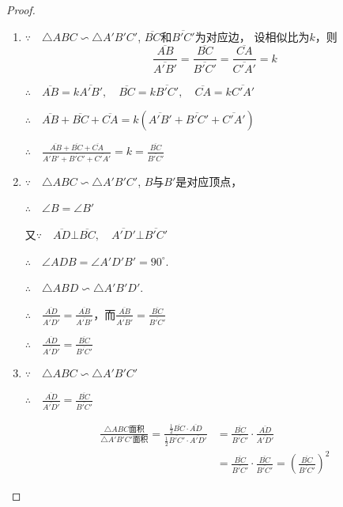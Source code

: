 \begin{proof}
\begin{enumerate}
    \item $\because\quad \triangle ABC\backsim \triangle A'B'C'$, $\overline{BC}$和$\overline{B'C'}$为对应边，
    设相似比为$k$，则
\[\frac{\overline{AB}}{\overline{A'B'}}=\frac{\overline{BC}}{\overline{B'C'}}=\frac{\overline{CA}}{\overline{C'A'}}=k\]

$\therefore\quad \overline{AB}=k\overline{A'B'},\quad  \overline{BC}=k\overline{B'C'},\quad \overline{CA}= k\overline{C'A'}$

$\therefore\quad \overline{AB}+\overline{BC}+\overline{CA}=k\left(\overline{A'B'}+\overline{B'C'}+\overline{C'A'}\right)$

$\therefore\quad \frac{\overline{AB} + \overline{BC} +\overline{CA}}{\overline{A'B'} + \overline{B'C'} +\overline{C'A'}}=k=\frac{\overline{BC}}{\overline{B'C'}}$

\item $\because\quad \triangle ABC\backsim\triangle A'B'C'$, $B$与$B'$是对应顶点，

$\therefore\quad \angle B=\angle B'$

    又$\because\quad \overline{AD}\bot \overline{BC},\quad \overline{A'D'}\bot \overline{B'C'}$

$\therefore\quad \angle ADB=\angle A'D'B'=90^{\circ}$.

$\therefore\quad \triangle ABD\backsim \triangle A'B'D'$.

$\therefore\quad \frac{\overline{AD}}{\overline{A'D'}}=\frac{\overline{AB}}{\overline{A'B'}}$，而$\frac{\overline{AB}}{\overline{A'B'}}=\frac{\overline{BC}}{\overline{B'C'}}$

$\therefore\quad \frac{\overline{AD}}{\overline{A'D'}}=\frac{\overline{BC}}{\overline{B'C'}}$

\item $\because\quad \triangle ABC\backsim \triangle A'B'C'$

$\therefore\quad \frac{\overline{AD}}{\overline{A'D'}}=\frac{\overline{BC}}{\overline{B'C'}}$

\[\begin{split}
\frac{\triangle ABC\text{面积}}{\triangle A'B'C'\text{面积}}
=\frac{\frac{1}{2}\overline{BC}\cdot \overline{AD}}{\frac{1}{2}\overline{B'C'}\cdot \overline{A'D'}}&=\frac{\overline{BC} }{\overline{B'C'}}\cdot\frac{\overline{AD}}{\overline{A'D'}}\\
&=\frac{\overline{BC} }{\overline{B'C'}}\cdot\frac{\overline{BC} }{\overline{B'C'}}=\left(\frac{\overline{BC}}{\overline{B'C'}}\right)^2    
\end{split}\]
\end{enumerate}
\end{proof}


